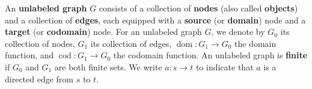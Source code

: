 \begin{definition}
    \label{def:graph:unlabeled}
    An \textbf{unlabeled graph} \( G \) consists of a collection of \textbf{nodes} (also called \textbf{objects}) and a collection of \textbf{edges}, each equipped with a \textbf{source} (or \textbf{domain}) node and a \textbf{target} (or \textbf{codomain}) node. 
    For an unlabeled graph \( G \), we denote by \( G_0 \) its collection of nodes, \( G_1 \) its collection of edges, \( \operatorname{dom}:G_1{\to}G_0 \) the domain function, and \( \operatorname{cod}:G_1{\to}G_0 \) the codomain function. An unlabeled graph is \textbf{finite} if \( G_0 \) and \( G_1 \) are both finite sets.
    We write \( a: s \to t \) to indicate that \( a \) is a directed edge from \( s \) to \( t \).
\end{definition}   
